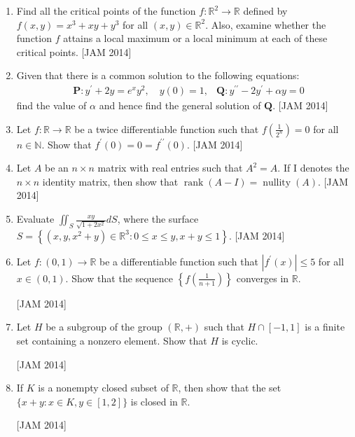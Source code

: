 \begin{enumerate}
\item  Find all the critical points of the function $f: \mathbb{R}^{2} \rightarrow \mathbb{R}$ defined by $f(x, y)=x^{3}+x y+y^{3}$ for all $(x, y) \in \mathbb{R}^{2}$. Also, examine whether the function $f$ attains a local maximum or a local minimum at each of these critical points.
\hfill [JAM 2014]




\item  Given that there is a common solution to the following equations:
$$
\begin{aligned}
&\mathbf{P}: y^{\prime}+2 y=e^{x} y^{2}, \quad y(0)=1,  
&\mathbf{Q}: y^{\prime \prime}-2 y^{\prime}+\alpha y=0
\end{aligned}
$$
find the value of $\alpha$ and hence find the general solution of $\mathbf{Q}$.
\hfill [JAM 2014]




\item  Let $f: \mathbb{R} \rightarrow \mathbb{R}$ be a twice differentiable function such that $f\left(\frac{1}{2^{n}}\right)=0$ for all $n \in \mathbb{N}$. Show that $f^{\prime}(0)=0=f^{\prime \prime}(0)$.
\hfill [JAM 2014]




\item  Let $A$ be an $n \times n$ matrix with real entries such that $A^{2}=A$. If I denotes the $n \times n$ identity matrix, then show that $\operatorname{rank}(A-I)=\operatorname{nullity}(A)$.
\hfill [JAM 2014]




\item  Evaluate $\iint_{S} \frac{x y}{\sqrt{1+2 x^{2}}} d S$, where the surface $S=\left\{\left(x, y, x^{2}+y\right) \in \mathbb{R}^{3}: 0 \leq x \leq y, x+y \leq 1\right\}$.
\hfill [JAM 2014]




\item  Let $f:(0,1) \rightarrow \mathbb{R}$ be a differentiable function such that $\left|f^{\prime}(x)\right| \leq 5$ for all $x \in(0,1)$. Show that the sequence $\left\{f\left(\frac{1}{n+1}\right)\right\}$ converges in $\mathbb{R}$.

\hfill [JAM 2014]



\item  Let $H$ be a subgroup of the group $(\mathbb{R},+)$ such that $H \cap[-1,1]$ is a finite set containing a nonzero element. Show that $H$ is cyclic.

\hfill [JAM 2014]



\item  If $K$ is a nonempty closed subset of $\mathbb{R}$, then show that the set $\{x+y: x \in K, y \in[1,2]\}$ is closed in $\mathbb{R}$.

\hfill [JAM 2014]





    
\end{enumerate}
\newpage
